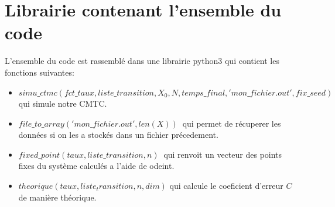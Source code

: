 \documentclass[a4paper]{article}
\begin{document}
\section{Librairie contenant l'ensemble du code}
L'ensemble du code est rassemblé dans une librairie python3
\cite{librairie} qui
contient les fonctions suivantes:
\begin{itemize}
  \item
    $simu\_ctmc(fct\_taux,liste\_transition,X_0,N,temps\_final,'mon\_fichier.out',fix\_seed)
    \ $
    qui simule notre CMTC.
  \item $file\_to\_array('mon\_fichier.out',len(X)) \ $ qui permet de
    récuperer les données si on les a stockés dans un fichier
    précedement.
  \item $fixed\_point(taux,liste\_transition,n) \ $ qui renvoit un vecteur
    des points fixes du système calculés a l'aide de odeint.
  \item $theorique(taux,liste_transition,n,dim)$ qui calcule le
    coeficient d'erreur $C \ $ de manière théorique.
\end{itemize}



\end{document}
